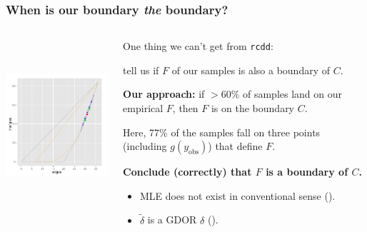 \documentclass[ 10pt]{beamer}
\newcommand{\yobs}{y_{\text{obs}}}
\begin{document}
\frame
{
\frametitle{When is our boundary \emph{the} boundary?}  

\begin{columns}[T]
\begin{column}[T]{0.25\textwidth}
\includegraphics[height=2.5in,trim=3.5in 2in 0.15in 0.05in,clip=true]{MCsample-77face} %
\end{column}

\begin{column}[T]{0.75\textwidth}
One thing we can't get from \texttt{rcdd}: 

tell us if $F$ of our samples is also a boundary of $C$.  
\vspace{2mm}

\textbf{Our approach:} if $>60\%$ of samples land on our empirical $F$, then $F$ is on the boundary $C$.
\vspace{4mm}

\pause
Here, 77\% of the samples fall on three points (including $g(\yobs)$) that define $F$.  
\vspace{2mm}

\textbf{Conclude (correctly) that $F$ is a boundary of $C$.}
\begin{itemize}
\item MLE does not exist in conventional sense (\alert{\checkmark}).
\item $\tilde{\delta}$ is a GDOR $\delta$ (\alert{\checkmark}).
\end{itemize}
\end{column}
\end{columns}
}
\end{document}
